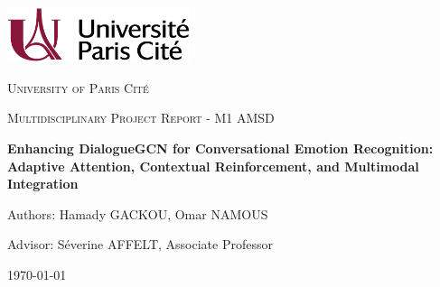 \documentclass[a4paper,11pt]{article}
\begin{document}
\begin{titlepage}
  \centering
  \includegraphics[width=0.4\textwidth]{images/logo_uni.png}\par\vspace{1cm}
  {\scshape\LARGE University of Paris Cité\par}
  \vspace{1cm}
  {\scshape\Large Multidisciplinary Project Report - M1 AMSD\par}
  \vspace{1.5cm}
  {\huge\bfseries Enhancing DialogueGCN for Conversational Emotion Recognition: Adaptive Attention, Contextual Reinforcement, and Multimodal Integration\par}
  \vfill
  {\large Authors: Hamady GACKOU, Omar NAMOUS\par}
  {\large Advisor: Séverine AFFELT, Associate Professor\par}
  \vspace{1cm}
  {\large \today}\par
\end{titlepage}
\end{document}
